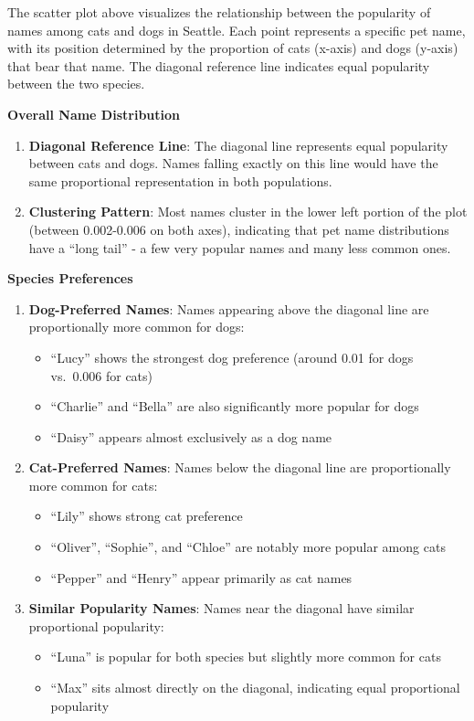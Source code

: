 \documentclass[
]{article}
\providecommand{\tightlist}{%
  \setlength{\itemsep}{0pt}\setlength{\parskip}{0pt}}
\begin{document}
The scatter plot above visualizes the relationship between the
popularity of names among cats and dogs in Seattle. Each point
represents a specific pet name, with its position determined by the
proportion of cats (x-axis) and dogs (y-axis) that bear that name. The
diagonal reference line indicates equal popularity between the two
species.

\textbf{Overall Name Distribution}

\begin{enumerate}
\def\labelenumi{\arabic{enumi}.}
\item
  \textbf{Diagonal Reference Line}: The diagonal line represents equal
  popularity between cats and dogs. Names falling exactly on this line
  would have the same proportional representation in both populations.
\item
  \textbf{Clustering Pattern}: Most names cluster in the lower left
  portion of the plot (between 0.002-0.006 on both axes), indicating
  that pet name distributions have a ``long tail'' - a few very popular
  names and many less common ones.
\end{enumerate}

\textbf{Species Preferences}

\begin{enumerate}
\def\labelenumi{\arabic{enumi}.}
\tightlist
\item
  \textbf{Dog-Preferred Names}: Names appearing above the diagonal line
  are proportionally more common for dogs:

  \begin{itemize}
  \tightlist
  \item
    ``Lucy'' shows the strongest dog preference (around 0.01 for dogs
    vs.~0.006 for cats)
  \item
    ``Charlie'' and ``Bella'' are also significantly more popular for
    dogs
  \item
    ``Daisy'' appears almost exclusively as a dog name
  \end{itemize}
\item
  \textbf{Cat-Preferred Names}: Names below the diagonal line are
  proportionally more common for cats:

  \begin{itemize}
  \tightlist
  \item
    ``Lily'' shows strong cat preference
  \item
    ``Oliver'', ``Sophie'', and ``Chloe'' are notably more popular among
    cats
  \item
    ``Pepper'' and ``Henry'' appear primarily as cat names
  \end{itemize}
\item
  \textbf{Similar Popularity Names}: Names near the diagonal have
  similar proportional popularity:

  \begin{itemize}
  \tightlist
  \item
    ``Luna'' is popular for both species but slightly more common for
    cats
  \item
    ``Max'' sits almost directly on the diagonal, indicating equal
    proportional popularity
  \end{itemize}
\end{enumerate}
\end{document}

